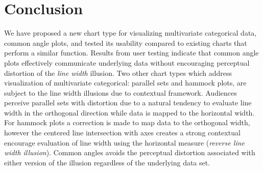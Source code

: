 \documentclass[journal]{vgtc}\usepackage{graphicx, color}
\begin{document}
\section{Conclusion}
We have proposed a new chart type for visualizing multivariate categorical data, common angle plots, 
and tested its usability compared to existing charts that perform a similar function. Results from user testing
indicate
that common angle plots effectively communicate underlying data without encouraging perceptual distortion of the 
\emph{line width} illusion.
Two other chart types which address visualization of multivariate categorical: parallel sets and hammock plots, 
are subject to the line width illusions due to 
contextual framework. Audiences perceive parallel sets with distortion due to a natural tendency to 
evaluate line width in the orthogonal direction while data is mapped to the horizontal width.
For hammock plots a correction is made to map data to the orthogonal width, however the centered line 
intersection with axes creates a strong contextual encourage evaluation of line width using the
horizontal measure (\emph{reverse line width illusion}). Common angles avoids the perceptual distortion 
associated with either version of the illusion regardless of the underlying data set.


%
\end{document}
